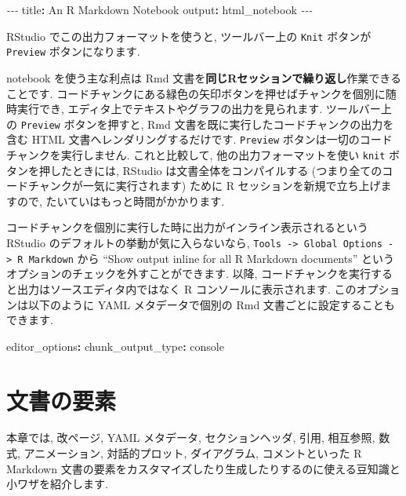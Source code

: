 \documentclass[
  11pt,
  lualatex,ja=standard,jafont=noto]{bxjsreport}
\newenvironment{Shaded}{\begin{snugshade}}{\end{snugshade}}
\newcommand{\AttributeTok}[1]{\textcolor[rgb]{0.77,0.63,0.00}{#1}}
\newcommand{\FunctionTok}[1]{\textcolor[rgb]{0.00,0.00,0.00}{#1}}
\newcommand{\KeywordTok}[1]{\textcolor[rgb]{0.13,0.29,0.53}{\textbf{#1}}}
\newcommand{\PreprocessorTok}[1]{\textcolor[rgb]{0.56,0.35,0.01}{\textit{#1}}}
\begin{document}
\begin{Shaded}
\begin{Highlighting}[]
\PreprocessorTok{{-}{-}{-}}
\FunctionTok{title}\KeywordTok{:}\AttributeTok{ An R Markdown Notebook}
\FunctionTok{output}\KeywordTok{:}\AttributeTok{ html\_notebook}
\PreprocessorTok{{-}{-}{-}}
\end{Highlighting}
\end{Shaded}

RStudio でこの出力フォーマットを使うと, ツールバー上の \texttt{Knit} ボタンが \texttt{Preview} ボタンになります.

notebook を使う主な利点は Rmd 文書を\textbf{同じRセッションで繰り返し}作業できることです. コードチャンクにある緑色の矢印ボタンを押せばチャンクを個別に随時実行でき, エディタ上でテキストやグラフの出力を見られます. ツールバー上の \texttt{Preview} ボタンを押すと, Rmd 文書を既に実行したコードチャンクの出力を含む HTML 文書へレンダリングするだけです. \texttt{Preview} ボタンは一切のコードチャンクを実行しません. これと比較して, 他の出力フォーマットを使い \texttt{knit} ボタンを押したときには, RStudio は文書全体をコンパイルする (つまり全てのコードチャンクが一気に実行されます) ために R セッションを新規で立ち上げますので, たいていはもっと時間がかかります.

コードチャンクを個別に実行した時に出力がインライン表示されるという RStudio のデフォルトの挙動が気に入らないなら, \texttt{Tools -\textgreater{}\ Global\ Options\ -\textgreater{}\ R\ Markdown} から ``Show output inline for all R Markdown documents'' というオプションのチェックを外すことができます. 以降, コードチャンクを実行すると出力はソースエディタ内ではなく R コンソールに表示されます. このオプションは以下のように YAML メタデータで個別の Rmd 文書ごとに設定することもできます.

\begin{Shaded}
\begin{Highlighting}[]
\FunctionTok{editor\_options}\KeywordTok{:}
\AttributeTok{  }\FunctionTok{chunk\_output\_type}\KeywordTok{:}\AttributeTok{ console}
\end{Highlighting}
\end{Shaded}

\hypertarget{document-elements}{%
\chapter{文書の要素}\label{document-elements}}

本章では, 改ページ, YAML メタデータ, セクションヘッダ, 引用, 相互参照, 数式, アニメーション, 対話的プロット, ダイアグラム, コメントといった R Markdown 文書の要素をカスタマイズしたり生成したりするのに使える豆知識と小ワザを紹介します.
\end{document}

